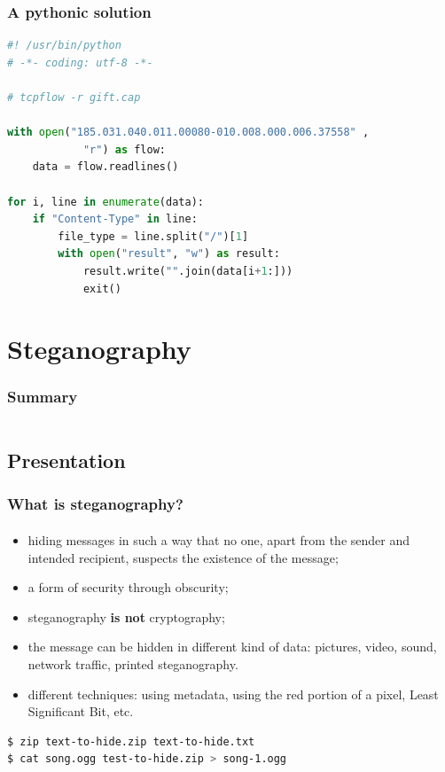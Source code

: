 \documentclass[]{beamer}
\begin{document}
\begin{frame}[fragile]
\frametitle{A pythonic solution}
\begin{lstlisting}[language=Python]
#! /usr/bin/python
# -*- coding: utf-8 -*-

# tcpflow -r gift.cap

with open("185.031.040.011.00080-010.008.000.006.37558" ,
            "r") as flow:
    data = flow.readlines()

for i, line in enumerate(data):
    if "Content-Type" in line:
        file_type = line.split("/")[1]
        with open("result", "w") as result:
            result.write("".join(data[i+1:]))
            exit()
\end{lstlisting}
\end{frame}
 







%
%
\section{Steganography}
\begin{frame}
    \frametitle{Summary}
    \begin{columns}[t]
        \begin{column}{5cm}
            \tableofcontents[sections={1-3}, currentsection, hideothersubsections]
        \end{column}
        \begin{column}{5cm}
            \tableofcontents[sections={4-5}, currentsection, hideothersubsections]
        \end{column}
    \end{columns}
\end{frame}
\subsection{Presentation}
\begin{frame}[fragile]
\frametitle{What is steganography?}
\framesubtitle{}
\begin{itemize}
\item hiding messages in such a way that no one, apart from the sender and intended recipient, suspects the existence of the message;
\item a form of security through obscurity;
\item steganography \textbf{is not} cryptography;
\item the message can be hidden in different kind of data: pictures, video, sound, network traffic, printed steganography.
\item different techniques: using metadata, using the red portion of a pixel, Least Significant Bit, etc.
\end{itemize}
\begin{lstlisting}[language=Bash]
$ zip text-to-hide.zip text-to-hide.txt
$ cat song.ogg test-to-hide.zip > song-1.ogg
\end{lstlisting}
\end{frame}
\end{document}
